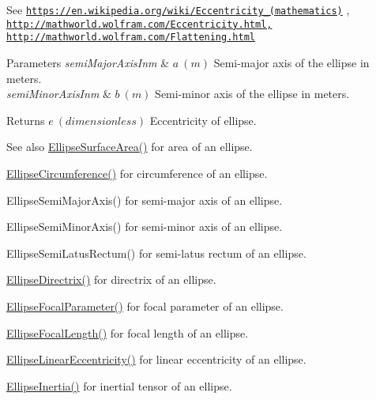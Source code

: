 See \href{https://en.wikipedia.org/wiki/Eccentricity_(mathematics)}{\tt https\+://en.\+wikipedia.\+org/wiki/\+Eccentricity\+\_\+(mathematics)} , \href{http://mathworld.wolfram.com/Eccentricity.html,}{\tt http\+://mathworld.\+wolfram.\+com/\+Eccentricity.\+html,} \href{http://mathworld.wolfram.com/Flattening.html}{\tt http\+://mathworld.\+wolfram.\+com/\+Flattening.\+html} 
\begin{DoxyParams}{Parameters}
{\em semi\+Major\+Axis\+Inm} & $ a\ (m)$ Semi-\/major axis of the ellipse in meters. \\
\hline
{\em semi\+Minor\+Axis\+Inm} & $ b\ (m)$ Semi-\/minor axis of the ellipse in meters. \\
\hline
\end{DoxyParams}
\begin{DoxyReturn}{Returns}
$ e\ (dimensionless)$ Eccentricity of ellipse. 
\end{DoxyReturn}
\begin{DoxySeeAlso}{See also}
\mbox{\hyperlink{group___e_g_x_math-_geometry-2_d-_ellipse-_surface_area_ga4ce8c8323e9718ce5458f4ab7f6d823d}{Ellipse\+Surface\+Area()}} for area of an ellipse. 

\mbox{\hyperlink{group___e_g_x_math-_geometry-2_d-_ellipse-_circumference_ga4172802ac674eb53467b44928ac635c7}{Ellipse\+Circumference()}} for circumference of an ellipse. 

Ellipse\+Semi\+Major\+Axis() for semi-\/major axis of an ellipse. 

Ellipse\+Semi\+Minor\+Axis() for semi-\/minor axis of an ellipse. 

Ellipse\+Semi\+Latus\+Rectum() for semi-\/latus rectum of an ellipse. 

\mbox{\hyperlink{group___e_g_x_math-_geometry-2_d-_ellipse-_directrix_gace8f72a8efbc9c18d3eb689151405106}{Ellipse\+Directrix()}} for directrix of an ellipse. 

\mbox{\hyperlink{group___e_g_x_math-_geometry-2_d-_ellipse-_focal_parameter_ga4cd01a38c72c092ef9791351948bf69b}{Ellipse\+Focal\+Parameter()}} for focal parameter of an ellipse. 

\mbox{\hyperlink{group___e_g_x_math-_geometry-2_d-_ellipse-_focal_length_gab8d63de7640c880cfecaeada6f2afdac}{Ellipse\+Focal\+Length()}} for focal length of an ellipse. 

\mbox{\hyperlink{group___e_g_x_math-_geometry-2_d-_ellipse-_linear_eccentricity_gac70b3010e30aa8b73deb50fe2b9b9a91}{Ellipse\+Linear\+Eccentricity()}} for linear eccentricity of an ellipse. 

\mbox{\hyperlink{group___e_g_x_math-_geometry-2_d-_ellipse-_inertia_ga10a3049c2f04b50f271fb01dc62e4cf8}{Ellipse\+Inertia()}} for inertial tensor of an ellipse. 
\end{DoxySeeAlso}
